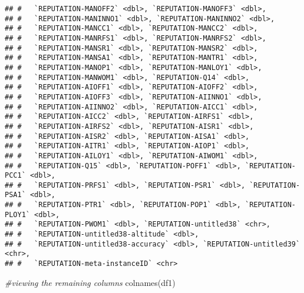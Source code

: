 \documentclass[
]{article}
\newenvironment{Shaded}{\begin{snugshade}}{\end{snugshade}}
\newcommand{\CommentTok}[1]{\textcolor[rgb]{0.56,0.35,0.01}{\textit{#1}}}
\newcommand{\FunctionTok}[1]{\textcolor[rgb]{0.00,0.00,0.00}{#1}}
\newcommand{\NormalTok}[1]{#1}
\begin{document}
\begin{verbatim}
## #   `REPUTATION-MANOFF2` <dbl>, `REPUTATION-MANOFF3` <dbl>,
## #   `REPUTATION-MANINNO1` <dbl>, `REPUTATION-MANINNO2` <dbl>,
## #   `REPUTATION-MANCC1` <dbl>, `REPUTATION-MANCC2` <dbl>,
## #   `REPUTATION-MANRFS1` <dbl>, `REPUTATION-MANRFS2` <dbl>,
## #   `REPUTATION-MANSR1` <dbl>, `REPUTATION-MANSR2` <dbl>,
## #   `REPUTATION-MANSA1` <dbl>, `REPUTATION-MANTR1` <dbl>,
## #   `REPUTATION-MANOP1` <dbl>, `REPUTATION-MANLOY1` <dbl>,
## #   `REPUTATION-MANWOM1` <dbl>, `REPUTATION-Q14` <dbl>,
## #   `REPUTATION-AIOFF1` <dbl>, `REPUTATION-AIOFF2` <dbl>,
## #   `REPUTATION-AIOFF3` <dbl>, `REPUTATION-AIINNO1` <dbl>,
## #   `REPUTATION-AIINNO2` <dbl>, `REPUTATION-AICC1` <dbl>,
## #   `REPUTATION-AICC2` <dbl>, `REPUTATION-AIRFS1` <dbl>,
## #   `REPUTATION-AIRFS2` <dbl>, `REPUTATION-AISR1` <dbl>,
## #   `REPUTATION-AISR2` <dbl>, `REPUTATION-AISA1` <dbl>,
## #   `REPUTATION-AITR1` <dbl>, `REPUTATION-AIOP1` <dbl>,
## #   `REPUTATION-AILOY1` <dbl>, `REPUTATION-AIWOM1` <dbl>,
## #   `REPUTATION-Q15` <dbl>, `REPUTATION-POFF1` <dbl>, `REPUTATION-PCC1` <dbl>,
## #   `REPUTATION-PRFS1` <dbl>, `REPUTATION-PSR1` <dbl>, `REPUTATION-PSA1` <dbl>,
## #   `REPUTATION-PTR1` <dbl>, `REPUTATION-POP1` <dbl>, `REPUTATION-PLOY1` <dbl>,
## #   `REPUTATION-PWOM1` <dbl>, `REPUTATION-untitled38` <chr>,
## #   `REPUTATION-untitled38-altitude` <dbl>,
## #   `REPUTATION-untitled38-accuracy` <dbl>, `REPUTATION-untitled39` <chr>,
## #   `REPUTATION-meta-instanceID` <chr>
\end{verbatim}

\begin{Shaded}
\begin{Highlighting}[]
\CommentTok{\#viewing the remaining columns}
\FunctionTok{colnames}\NormalTok{(df1)}
\end{Highlighting}
\end{Shaded}
\end{document}
